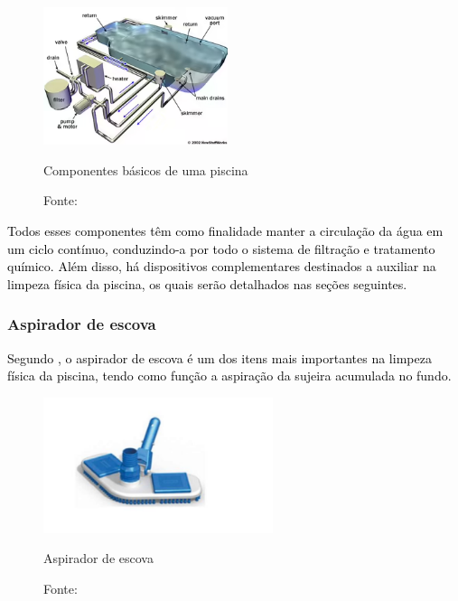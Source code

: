         \begin{figure}[H]
         	\centering
         	\caption{ }  
        	\centering
         	\label{fig:cont}
        	\includegraphics[width=0.48\textwidth]{imagens/componentesPiscina.png}
            \caption*{Componentes básicos de uma piscina}
        	\caption*{Fonte: \cite{refComponents}}
         \end{figure}

        \textcolor{black}{Todos esses componentes têm como finalidade manter a circulação da água em um ciclo contínuo, conduzindo-a por todo o sistema de filtração e tratamento químico. Além disso, há dispositivos complementares destinados a auxiliar na limpeza física da piscina, os quais serão detalhados nas seções seguintes.}

        \subsubsection*{Aspirador de escova}

         \textcolor{black}{Segundo \cite{benedito2024projeto}, o aspirador de escova é um dos itens mais importantes na limpeza física da piscina, tendo como função a aspiração da sujeira acumulada no fundo.}

            \begin{figure}[H]
                \centering
                \caption{ }  
                \centering
                \label{fig:cont}
                \includegraphics[width=0.60\textwidth]{imagens/aspirador.png}
                \caption*{Aspirador de escova}
                \caption*{Fonte: \cite{benedito2024projeto}}
            \end{figure}


